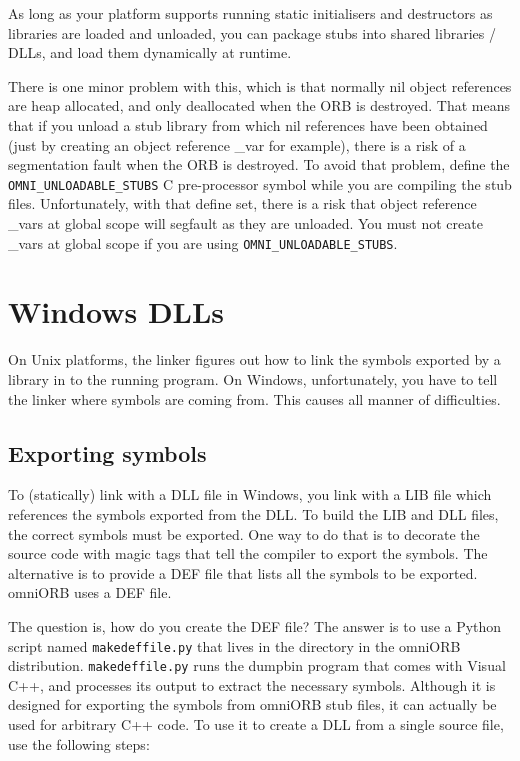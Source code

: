 \documentclass[11pt,twoside,a4paper]{book}
\newcommand{\code}[1]{\texttt{#1}}
\newcommand{\cmdline}[1]{\texttt{#1}}
\newcommand{\file}{\begingroup \urlstyle{tt}\Url}
\begin{document}
As long as your platform supports running static initialisers and
destructors as libraries are loaded and unloaded, you can package
stubs into shared libraries / DLLs, and load them dynamically at
runtime.

There is one minor problem with this, which is that normally nil
object references are heap allocated, and only deallocated when the
ORB is destroyed. That means that if you unload a stub library from
which nil references have been obtained (just by creating an object
reference \_var for example), there is a risk of a segmentation fault
when the ORB is destroyed. To avoid that problem, define the
\code{OMNI\_UNLOADABLE\_STUBS} C pre-processor symbol while you are
compiling the stub files. Unfortunately, with that define set, there
is a risk that object reference \_vars at global scope will segfault
as they are unloaded. You must not create \_vars at global scope if
you are using \code{OMNI\_UNLOADABLE\_STUBS}.


\section{Windows DLLs}

On Unix platforms, the linker figures out how to link the symbols
exported by a library in to the running program. On Windows,
unfortunately, you have to tell the linker where symbols are coming
from. This causes all manner of difficulties.

\subsection{Exporting symbols}

To (statically) link with a DLL file in Windows, you link with a LIB
file which references the symbols exported from the DLL. To build the
LIB and DLL files, the correct symbols must be exported. One way to do
that is to decorate the source code with magic tags that tell the
compiler to export the symbols. The alternative is to provide a DEF
file that lists all the symbols to be exported. omniORB uses a DEF
file.

The question is, how do you create the DEF file?  The answer is to use
a Python script named \cmdline{makedeffile.py} that lives in the
\file{bin\scripts} directory in the omniORB distribution.
\cmdline{makedeffile.py} runs the dumpbin program that comes with
Visual C++, and processes its output to extract the necessary symbols.
Although it is designed for exporting the symbols from omniORB stub
files, it can actually be used for arbitrary C++ code. To use it to
create a DLL from a single source file, use the following steps:
\end{document}
